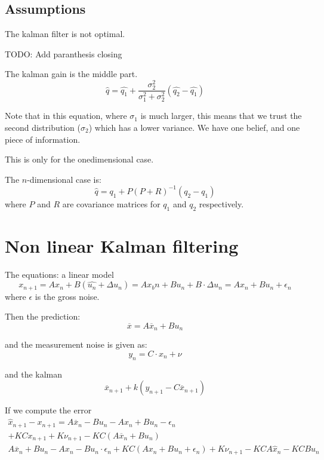 \documentclass[a4paper]{article}
\begin{document}
\raggedright

\subsection{Assumptions}
The kalman filter is not optimal.

TODO: Add paranthesis closing

The kalman gain is the middle part.
\begin{equation}
\hat{q} = \hat{q_1} + \frac{\sigma_2^{2}}{\sigma_1^{2} + \sigma_2^{2} }(\hat{q_2} - \hat{q_1} )
\end{equation}

Note that in this equation, where $ \sigma_1 $ is much larger, this means that we trust the second distribution ($ \sigma_2 $) which has a lower variance. 
We have one belief, and one piece of information. 

This is only for the onedimensional case.

The $ n $-dimensional case is:
 \begin{equation}
\hat{q} = q_1 + P(P + R)^{-1} (q_2-q_1)
\end{equation}
where $ P $ and $ R $ are covariance matrices for $ q_1 $ and $ q_2 $ respectively.


\section{Non linear Kalman filtering}
The equations:
a linear model
\begin{equation}
	x_{n+1} = Ax_n + B(\hat{u_n} + \Delta u_n) = Ax_bn + Bu_n + B\cdot \Delta u_n = Ax_n + B u_n + \epsilon_n 
\end{equation}
where $ \epsilon $ is the gross noise.

Then the prediction:
\begin{equation}
\overline{x} = A \overline{x}_n + B u_n
\end{equation}

and the measurement noise is given as:
\begin{equation}
y_n = C \cdot x_n + \nu
\end{equation}

and the kalman
\begin{equation}
	\overline{x}_{n+1} + k(y_{n+1} - C \overline{x}_{n+1})
\end{equation}

If we compute the error
\begin{equation}
	\begin{split}
		\hat{x}_{n+1} - x_{n+1} = A \overline{x}_n - B u_n - A x_n + B u_n - \epsilon_n \\ + K C x_{n+1} + K \nu_{n+1} - K C (A \overline{x}_n + B u_n) \\ A \overline{x}_n + B u_n - A x_n - B u_n \cdot \epsilon_n + K C (A x_n + B u_n + \epsilon_n) + K \nu_{n+1} - K C A \hat{x}_n - K C B u_n
	\end{split}
\end{equation}
\end{document}
